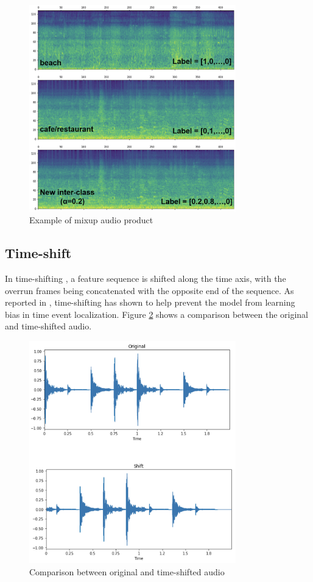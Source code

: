 \begin{figure}[!htb]
    \centering
    \includegraphics[width=0.8\textwidth]{fig/mixup.png}
    \caption{Example of mixup audio product}
    \label{fig:mixup}
\end{figure}

\subsection{Time-shift}
In time-shifting \cite{timeshift}, a feature sequence is shifted along the time axis, with the overrun frames being concatenated with the opposite end of the sequence. As reported in \cite{Miyazaki2020CONFORMERBASEDSE}, time-shifting has shown to help prevent the model from learning bias in time event localization. Figure \ref{fig:timeshift} shows a comparison between the original and time-shifted audio.

\begin{figure}[!htb]
    \centering
    \includegraphics[width=0.8\textwidth]{fig/time-shift.png}
    \caption{Comparison between original and time-shifted audio}
    \label{fig:timeshift}
\end{figure}

